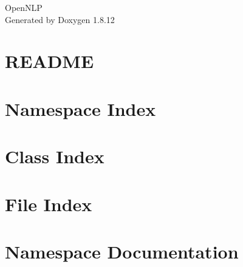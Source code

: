 \documentclass[twoside]{book}
\newcommand{\+}{\discretionary{\mbox{\scriptsize$\hookleftarrow$}}{}{}}
\newcommand{\clearemptydoublepage}{%
  \newpage{\pagestyle{empty}\cleardoublepage}%
}
\begin{document}
\hypersetup{pageanchor=false,
             bookmarksnumbered=true,
             pdfencoding=unicode
            }
\begin{titlepage}
\vspace*{7cm}
\begin{center}%
{\Large Open\+N\+LP }\\
\vspace*{1cm}
{\large Generated by Doxygen 1.8.12}\\
\end{center}
\end{titlepage}
\clearemptydoublepage
{}
\tableofcontents
\clearemptydoublepage
{}
\hypersetup{pageanchor=true}

\chapter{R\+E\+A\+D\+ME}
\label{md__r_e_a_d_m_e}
\hypertarget{md__r_e_a_d_m_e}{}

\chapter{Namespace Index}

\chapter{Class Index}

\chapter{File Index}

\chapter{Namespace Documentation}






\end{document}

